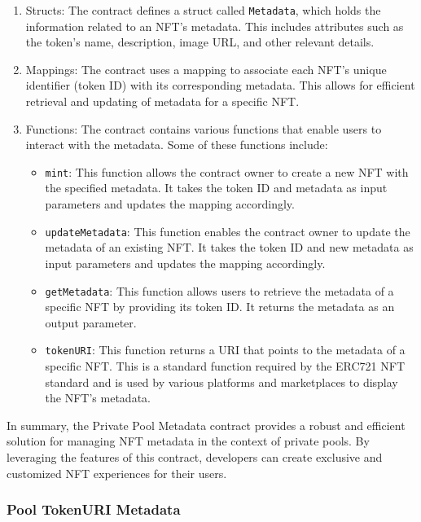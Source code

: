 \begin{enumerate}
\def\labelenumi{\arabic{enumi}.}
\item
  Structs: The contract defines a struct called \texttt{Metadata}, which
  holds the information related to an NFT's metadata. This includes
  attributes such as the token's name, description, image URL, and other
  relevant details.
\item
  Mappings: The contract uses a mapping to associate each NFT's unique
  identifier (token ID) with its corresponding metadata. This allows for
  efficient retrieval and updating of metadata for a specific NFT.
\item
  Functions: The contract contains various functions that enable users
  to interact with the metadata. Some of these functions include:

  \begin{itemize}
  \item
    \texttt{mint}: This function allows the contract owner to create a
    new NFT with the specified metadata. It takes the token ID and
    metadata as input parameters and updates the mapping accordingly.
  \item
    \texttt{updateMetadata}: This function enables the contract owner to
    update the metadata of an existing NFT. It takes the token ID and
    new metadata as input parameters and updates the mapping
    accordingly.
  \item
    \texttt{getMetadata}: This function allows users to retrieve the
    metadata of a specific NFT by providing its token ID. It returns the
    metadata as an output parameter.
  \item
    \texttt{tokenURI}: This function returns a URI that points to the
    metadata of a specific NFT. This is a standard function required by
    the ERC721 NFT standard and is used by various platforms and
    marketplaces to display the NFT's metadata.
  \end{itemize}
\end{enumerate}

In summary, the Private Pool Metadata contract provides a robust and
efficient solution for managing NFT metadata in the context of private
pools. By leveraging the features of this contract, developers can
create exclusive and customized NFT experiences for their users.

\hypertarget{pool-tokenuri-metadata}{%
\subsubsection{Pool TokenURI Metadata}\label{pool-tokenuri-metadata}}

